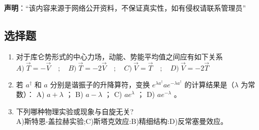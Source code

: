 
\textbf{声明}：“该内容来源于网络公开资料，不保证真实性，如有侵权请联系管理员”

\subsection{选择题}
\begin{enumerate}
\item 对于库仑势形式的中心力场，动能、势能平均值之间应有如下关系
$A) \ \vec{T} = -\vec{V} \quad ; \quad B) \ \vec{T} = -2\vec{V} \quad ; \quad 
C) \ \vec{V} = \vec{T} \quad ; \quad D) \ \vec{V} = -2\vec{T} $
\item 若 $a^{\dagger}$ 和 $a$ 分别是谐振子的升降算符，变换 $e^{\lambda a^{\dagger}} a e^{-\lambda a^{\dagger}}$ 的计算结果是（$\lambda$ 为常数）：
A) $a + \lambda$ ； B) $a - \lambda$ ； C) $a e^{\lambda}$ ； D) $a e^{-\lambda}$ 。
\item 下列哪种物理实验或现象与自旋无关?\\
A)斯特恩-盖拉赫实验;C)斯塔克效应:B)精细结构:D)反常塞曼效应。
\end{enumerate}

